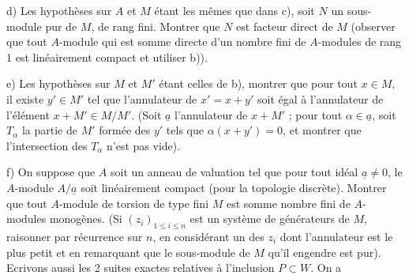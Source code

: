 d) Les hypothèses sur $A$ et $M$ étant les mêmes que dans c), soit $N$ un sous-module pur de $M$, de rang fini. Montrer que $N$ est facteur direct de $M$ (observer que tout $A$-module qui est somme directe d'un nombre fini de $A$-modules de rang 1 est linéairement compact et utiliser b)).

e) Les hypothèses sur $M$ et $M'$ étant celles de b), montrer que pour tout $x\in M$, il existe $y'\in M'$ tel que l'annulateur de $x'=x+y'$ soit égal à l'annulateur de l'élément $x+M'\in M/M'$. (Soit $\underline a$ l'annulateur de $x+M'$ ; pour tout $\alpha\in\underline a$, soit $T_\alpha$ la partie de $M'$ formée des $y'$ tels que $\alpha(x+y')=0$, et montrer que l'intersection des $T_\alpha$ n'est pas vide).

f) On suppose que $A$ soit un anneau de valuation tel que pour tout idéal $\underline a\ne0$, le $A$-module $A/\underline a$ soit linéairement compact (pour la topologie discrète). Montrer que tout $A$-module de torsion de type fini $M$ est somme  nombre fini de $A$-modules monogènes. (Si $(z_i)_{1\le i\le n}$ est un système de générateurs de $M$, raisonner par récurrence sur $n$, en considérant un des $z_i$ dont l'annulateur est le plus petit et en remarquant que le sous-module de $M$ qu'il engendre est pur).
Ecrivons aussi les 2 suites exactes relatives à l'inclusion $P\subset W$. On a

